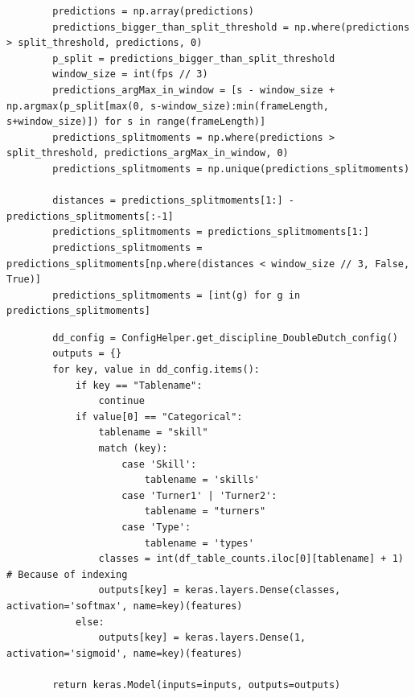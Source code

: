 \begin{listing}
    \begin{verbatim}
        predictions = np.array(predictions)
        predictions_bigger_than_split_threshold = np.where(predictions > split_threshold, predictions, 0)
        p_split = predictions_bigger_than_split_threshold
        window_size = int(fps // 3)
        predictions_argMax_in_window = [s - window_size + np.argmax(p_split[max(0, s-window_size):min(frameLength, s+window_size)]) for s in range(frameLength)]
        predictions_splitmoments = np.where(predictions > split_threshold, predictions_argMax_in_window, 0)
        predictions_splitmoments = np.unique(predictions_splitmoments)

        distances = predictions_splitmoments[1:] - predictions_splitmoments[:-1]
        predictions_splitmoments = predictions_splitmoments[1:]
        predictions_splitmoments = predictions_splitmoments[np.where(distances < window_size // 3, False, True)]
        predictions_splitmoments = [int(g) for g in predictions_splitmoments]
    \end{verbatim}
    \caption[predictions-to-splitpoints]{Code which filters splitpoints from the raw predicted splitpoint values to frame numbers.}
    \label{code:predictions-to-splitpoints}
\end{listing}


\begin{listing}
    \begin{verbatim}
        dd_config = ConfigHelper.get_discipline_DoubleDutch_config()
        outputs = {}
        for key, value in dd_config.items():
            if key == "Tablename":
                continue
            if value[0] == "Categorical":
                tablename = "skill"
                match (key):
                    case 'Skill':
                        tablename = 'skills'
                    case 'Turner1' | 'Turner2':
                        tablename = "turners"
                    case 'Type':
                        tablename = 'types'
                classes = int(df_table_counts.iloc[0][tablename] + 1) # Because of indexing
                outputs[key] = keras.layers.Dense(classes, activation='softmax', name=key)(features)
            else:
                outputs[key] = keras.layers.Dense(1, activation='sigmoid', name=key)(features)

        return keras.Model(inputs=inputs, outputs=outputs)
    \end{verbatim}
    \caption[Keras output layers for skills]{Keras output layers for skills}
    \label{code:keras-skill-top-layers}
\end{listing}

